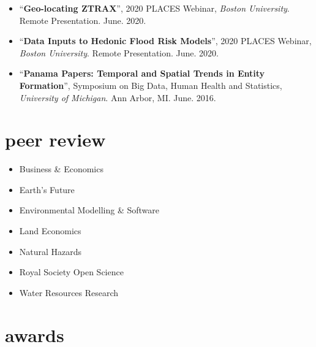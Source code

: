 \documentclass[10pt,oneside]{article}
\begin{document}
\begin{itemize}[label={}]
  \item \enquote{\textbf{Geo-locating ZTRAX}}, 2020 PLACES Webinar,  \textit{Boston University}. Remote Presentation.  June. 2020.
        
  \item \enquote{\textbf{Data Inputs to Hedonic Flood Risk Models}}, 2020 PLACES Webinar,  \textit{Boston University}. Remote Presentation.  June. 2020.
        
  \item \enquote{\textbf{Panama Papers: Temporal and Spatial Trends in Entity Formation}}, Symposium on Big Data, Human Health and Statistics,  \textit{University of Michigan}. Ann Arbor, MI.  June. 2016.
        
\end{itemize}


\section{peer review}

\mbox{}\vspace{-\dimexpr\baselineskip\relax}

\begin{itemize}[label={}]
  
    \item Business \& Economics
  
    \item Earth's Future
  
    \item Environmental Modelling \& Software
  
    \item Land Economics
  
    \item Natural Hazards
  
    \item Royal Society Open Science
  
    \item Water Resources Research
  
\end{itemize}


\section{awards}

\mbox{}\vspace{-\dimexpr\baselineskip\relax}
\end{document}
